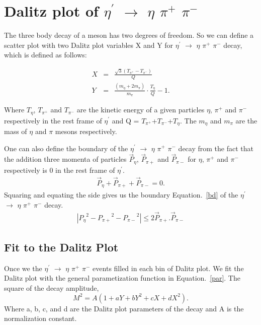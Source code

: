 \documentclass[12pt,a4paper]{amsbook}
\theoremstyle{definition}
\begin{document}
 \section{Dalitz plot of $\eta^{\prime}$ $\rightarrow$ $\eta$ $\pi^{+}$ $\pi^{-}$}
 The three body decay of a meson has two degrees of freedom.  So we can define a scatter plot with two Dalitz plot variables X and Y for $\eta^{\prime}$ $\rightarrow$ $\eta$ $\pi^{+}$ $\pi^{-}$ decay, which is defined as follows:

\begin{eqnarray}
X&=&\frac{\sqrt{3}(T_{\pi^{+}} -T_{\pi^{-}})}{Q} \\ 
Y&=&\frac{(m_{\eta}+2m_{\pi})}{m_{\pi} }\cdot \frac{T_{\eta}}{Q} - 1.
\end{eqnarray}

Where $T_{\eta}$, $T_{\pi^{+}}$ and $T_{\pi^{-}}$ are the kinetic energy of a given particles $\eta$, $\pi^{+}$ and $\pi^{-}$ respectively in the rest frame of $\eta^{\prime}$ and Q = $T_{\pi^{+}}$+$T_{\pi^{-}}$+$T_{\eta}$. The $m_{\eta}$ and $m_{\pi}$ are the mass of  $\eta$ and $\pi$ mesons respectively. 

One can also define the boundary of the $\eta^{\prime}$ $\rightarrow$ $\eta$ $\pi^{+}$ $\pi^{-}$ decay from the fact that the addition three momenta of particles $\vec{P}_{\eta}$, $\vec{P}_{\pi+}$ and $\vec{P}_{\pi-}$ for $\eta$, $\pi^{+}$ and $\pi^{-}$ respectively is 0 in the rest frame of $\eta^{\prime}$.
\begin{eqnarray*}
\vec{P}_{\eta} + \vec{P}_{\pi+} + \vec{P}_{\pi-} = 0.
\end{eqnarray*}
Squaring and equating the side gives us the boundary Equation.~\ref{bd} of the $\eta^{\prime}$ $\rightarrow$ $\eta$ $\pi^{+}$ $\pi^{-}$ decay.
\begin{eqnarray}
|{{P}_{\eta}}^2 - {{P}_{\pi+}}^2 - {{P}_{\pi-}}^2| \leq 2\vec{P}_{\pi+} . \vec{P}_{\pi-}
\label{bd}
\end{eqnarray}

\subsection{Fit to the Dalitz Plot }

Once we the $\eta^{\prime}$ $\rightarrow$ $\eta$ $\pi^{+}$ $\pi^{-}$ events filled in each bin of Dalitz plot. We fit the Dalitz plot with the general parametization function in Equation.~\ref{par}. The square of the decay amplitude,
 \begin{equation}
M^{2}=A(1+aY+bY^{2}+cX+dX^{2}).
\label{par}
\end{equation}
Where a, b, c, and d are the Dalitz plot parameters of the decay and A is the normalization constant.
\end{document}
